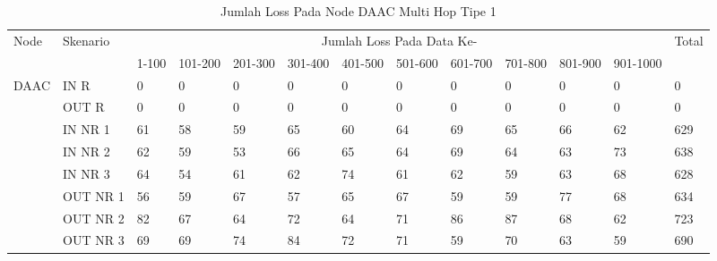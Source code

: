 \begin{table}[H]
  \centering
  \caption{Jumlah Loss Pada Node DAAC Multi Hop Tipe 1}
    \begin{tabular}{|p{1cm}|p{1.9cm}|p{0.6cm}|p{0.6cm}|p{0.6cm}|p{0.6cm}|p{0.6cm}|p{0.6cm}|p{0.6cm}|p{0.6cm}|p{0.6cm}|p{0.6cm}|p{1cm}|}
    \hline
        \multirow{2}{*}{Node}&\multirow{2}{*}{Skenario}&\multicolumn{10}{|c|}{Jumlah Loss Pada Data Ke-}&\multirow{2}{*}{Total} \\\cline{3-12}
          & & 1-100 & 101-200 & 201-300 & 301-400 & 401-500 & 501-600 & 601-700 & 701-800 & 801-900 & 901-1000 & \\
        \hline
    \multirow{8}{*}{DAAC}  
    & IN R  & 0     & 0     & 0     & 0     & 0     & 0     & 0     & 0     & 0     & 0     & 0 \\
          & OUT R & 0     & 0     & 0     & 0     & 0     & 0     & 0     & 0     & 0     & 0     & 0 \\
          & IN NR 1 & 61    & 58    & 59    & 65    & 60    & 64    & 69    & 65    & 66    & 62    & 629 \\
          & IN NR 2 & 62    & 59    & 53    & 66    & 65    & 64    & 69    & 64    & 63    & 73    & 638 \\
          & IN NR 3 & 64    & 54    & 61    & 62    & 74    & 61    & 62    & 59    & 63    & 68    & 628 \\
          & OUT NR 1 & 56    & 59    & 67    & 57    & 65    & 67    & 59    & 59    & 77    & 68    & 634 \\
          & OUT NR 2 & 82    & 67    & 64    & 72    & 64    & 71    & 86    & 87    & 68    & 62    & 723 \\
          & OUT NR 3 & 69    & 69    & 74    & 84    & 72    & 71    & 59    & 70    & 63    & 59    & 690 \\
    
    
    \hline
    \end{tabular}%
  \label{tab:addlabel}%
\end{table}%

